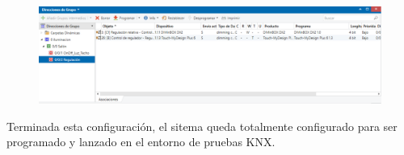 \documentclass[10pt]{article}
\begin{document}
\begin{figure}[H]
	\begin{center}
	 		\includegraphics[width = 1.00\textwidth]{Imagenes/img12}
	\end{center} 
\end{figure}

Terminada esta configuración, el sitema queda totalmente configurado para ser programado y lanzado en el entorno de pruebas KNX. \\
\end{document}
